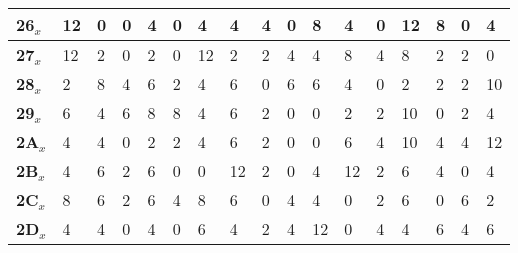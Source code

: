 \begin{longtable}[c]{|l|l|l|l|l|l|l|l|l|l|l|l|l|l|l|l|l|}
\textbf{26$_x$} & 12             & 0              & 0              & 4              & 0              & 4              & 4              & 4              & 0              & 8              & 4              & 0              & 12             & 8              & 0              & 4              \\ \hline
\textbf{27$_x$} & 12             & 2              & 0              & 2              & 0              & 12             & 2              & 2              & 4              & 4              & 8              & 4              & 8              & 2              & 2              & 0              \\ \hline
\textbf{28$_x$} & 2              & 8              & 4              & 6              & 2              & 4              & 6              & 0              & 6              & 6              & 4              & 0              & 2              & 2              & 2              & 10             \\ \hline
\textbf{29$_x$} & 6              & 4              & 6              & 8              & 8              & 4              & 6              & 2              & 0              & 0              & 2              & 2              & 10             & 0              & 2              & 4              \\ \hline
\textbf{2A$_x$} & 4              & 4              & 0              & 2              & 2              & 4              & 6              & 2              & 0              & 0              & 6              & 4              & 10             & 4              & 4              & 12             \\ \hline
\textbf{2B$_x$} & 4              & 6              & 2              & 6              & 0              & 0              & 12             & 2              & 0              & 4              & 12             & 2              & 6              & 4              & 0              & 4              \\ \hline
\textbf{2C$_x$} & 8              & 6              & 2              & 6              & 4              & 8              & 6              & 0              & 4              & 4              & 0              & 2              & 6              & 0              & 6              & 2              \\ \hline
\textbf{2D$_x$} & 4              & 4              & 0              & 4              & 0              & 6              & 4              & 2              & 4              & 12             & 0              & 4              & 4              & 6              & 4              & 6              \\ \hline

\end{longtable}
